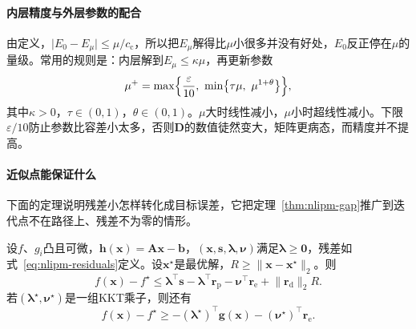 \paragraph{内层精度与外层参数的配合}
由定义，$\lvert E_0-E_\mu\rvert\leq\mu/c_{\mathrm{c}}$，所以把$E_\mu$解得比$\mu$小很多并没有好处，$E_0$反正停在$\mu$的量级。常用的规则是：内层解到$E_\mu\leq\kappa\mu$，再更新参数
\begin{equation}
 \mu^+=\max\Bigl\{\frac{\varepsilon}{10},\ \min\bigl\{\tau\mu,\ \mu^{1+\theta}\bigr\}\Bigr\},
 \label{eq:nlipm-mu-update}
\end{equation}
其中$\kappa>0$，$\tau\in(0,1)$，$\theta\in(0,1)$。$\mu$大时线性减小，$\mu$小时超线性减小。下限$\varepsilon/10$防止参数比容差小太多，否则$\bm{D}$的数值徒然变大，矩阵更病态，而精度并不提高。

\paragraph{近似点能保证什么}
下面的定理说明残差小怎样转化成目标误差，它把定理~\ref{thm:nlipm-gap}推广到迭代点不在路径上、残差不为零的情形。

\begin{theorem}[近似点的目标误差]
\label{thm:nlipm-approx-certificate}
设$f$、$g_i$凸且可微，$\bm{h}(\bm{x})=\bm{A}\bm{x}-\bm{b}$，$(\bm{x},\bm{s},\bm{\lambda},\bm{\nu})$满足$\bm{\lambda}\geq\bm{0}$，残差如式~\eqref{eq:nlipm-residuals}定义。设$\bm{x}^\star$是最优解，$R\geq\lVert\bm{x}-\bm{x}^\star\rVert_2$。则
\begin{equation}
 f(\bm{x})-f^\star\leq\bm{\lambda}^\top\bm{s}-\bm{\lambda}^\top\bm{r}_{\mathrm{p}}-\bm{\nu}^\top\bm{r}_{\mathrm{e}}+\lVert\bm{r}_{\mathrm{d}}\rVert_2R.
 \label{eq:nlipm-approx-upper}
\end{equation}
若$(\bm{\lambda}^\star,\bm{\nu}^\star)$是一组KKT乘子，则还有
\begin{equation}
 f(\bm{x})-f^\star\geq-(\bm{\lambda}^\star)^\top\bm{g}(\bm{x})-(\bm{\nu}^\star)^\top\bm{r}_{\mathrm{e}}.
 \label{eq:nlipm-approx-lower}
\end{equation}
\end{theorem}

